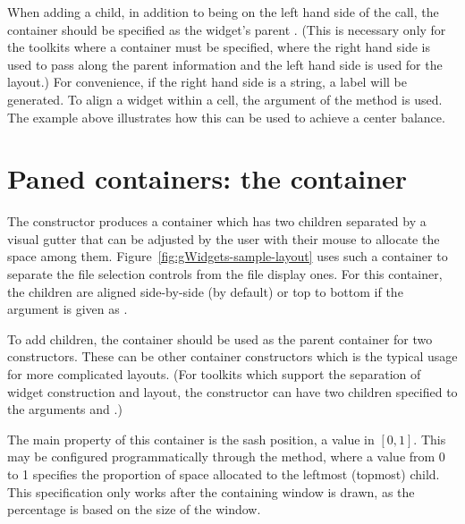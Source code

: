 When adding a child, in addition to being on the left hand side of the
\code{[\ASSIGN} call, the  container should be specified as
the widget's parent . (This is necessary only for the toolkits where a
container must be specified, where the right hand side is used to pass
along the parent information and the left hand side is used for the
layout.) For convenience, if the right hand side is a string, a label
will be generated.  To align a widget within a cell, the
 argument of the \code{[\ASSIGN}{glayout} method
is used. The example above illustrates how this can be used to achieve
a center balance.





\section{Paned containers: the  container}
\label{sec:gWidgets-gpanedgroup-container}

The  constructor produces a container which
has two children separated by a visual gutter that can be
adjusted by the user with their mouse to allocate the space among them.
Figure~\ref{fig:gWidgets-sample-layout} uses such a
container to separate the file selection controls from the file
display ones.  For this container, the children are aligned
side-by-side (by default) or top to bottom if the
 argument is given as
. 


To add children, the container should be used as the parent container
for two constructors. These can be other container constructors which
is the typical usage for more complicated layouts.
(For toolkits which support the separation of widget
construction and layout, the  constructor can
have two children specified to the arguments
 and .)

The main property of this container is the sash position, a value in
$[0,1]$. This may be configured programmatically
through the  method, where a value
from 0 to 1 specifies the proportion of space allocated to the
leftmost (topmost) child. This specification only works after the
containing window is drawn, as the percentage is based on the size of
the window.


